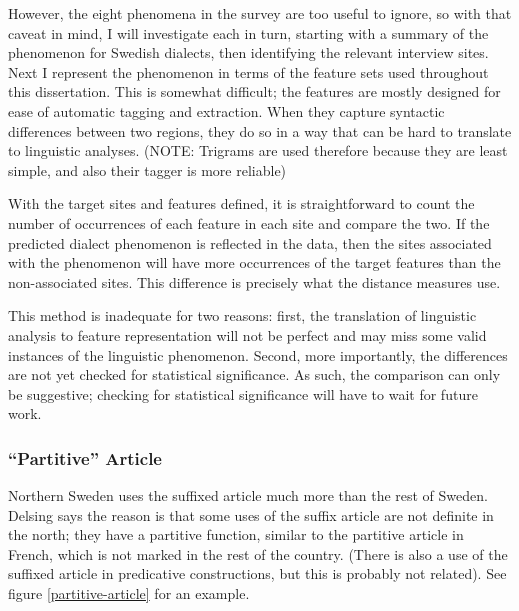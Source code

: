 However, the eight phenomena in the survey are too useful to ignore, so
with that caveat in mind, I will investigate each in turn, starting
with a summary of the phenomenon for Swedish dialects, then
identifying the relevant interview sites. Next I represent the
phenomenon in terms of the feature sets used throughout this
dissertation. This is somewhat difficult; the features are mostly designed
for ease of automatic tagging and extraction. When they capture
syntactic differences between two regions, they do so in a way that
can be hard to translate to linguistic analyses. (NOTE: Trigrams are
used therefore because they are least simple, and also their tagger is
more reliable)

With the target sites and features defined, it is straightforward to count the
number of occurrences of each feature in each site and compare the
two. If the predicted dialect phenomenon is reflected in the data,
then the sites associated with the phenomenon will have more
occurrences of the target features than the non-associated sites. This
difference is precisely what the distance measures use.

This method is inadequate for two reasons: first, the translation of
linguistic analysis to feature representation will not be perfect and
may miss some valid instances of the linguistic phenomenon. Second,
more importantly, the differences are not yet checked for statistical
significance. As such, the comparison can only be suggestive;
checking for statistical significance will have to wait for future
work.


\subsubsection{``Partitive'' Article}

Northern Sweden uses the suffixed article much more than the rest of
Sweden. Delsing says the reason is that some uses of the suffix
article are not definite in the north; they have a partitive function,
similar to the partitive article in French, which is not marked in the
rest of the country. (There is also a use of the suffixed article in
predicative constructions, but this is probably not related). See
figure \ref{partitive-article} for an example.


